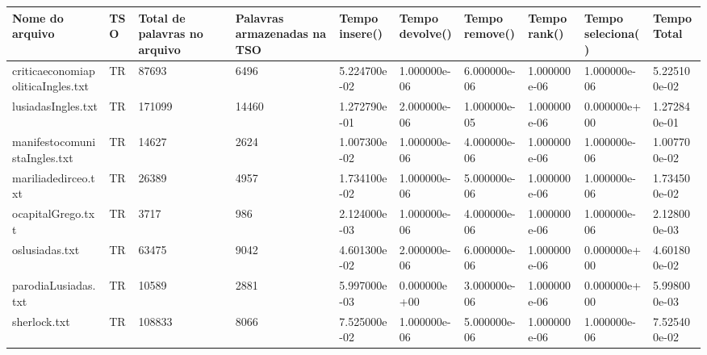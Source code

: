 \begin{tabular}{|l|l|l|l|l|l|l|l|l|l|}
\hline
Nome do arquivo&TSO&Total de palavras no arquivo&Palavras armazenadas na TSO&Tempo insere()&Tempo devolve()&Tempo remove()&Tempo rank()&Tempo seleciona()&Tempo Total\\
\hline
criticaeconomiapoliticaIngles.txt&TR&87693&6496&5.224700e-02&1.000000e-06&6.000000e-06&1.000000e-06&1.000000e-06&5.225100e-02\\
\hline
lusiadasIngles.txt&TR&171099&14460&1.272790e-01&2.000000e-06&1.000000e-05&1.000000e-06&0.000000e+00&1.272840e-01\\
\hline
manifestocomunistaIngles.txt&TR&14627&2624&1.007300e-02&1.000000e-06&4.000000e-06&1.000000e-06&1.000000e-06&1.007700e-02\\
\hline
mariliadedirceo.txt&TR&26389&4957&1.734100e-02&1.000000e-06&5.000000e-06&1.000000e-06&1.000000e-06&1.734500e-02\\
\hline
ocapitalGrego.txt&TR&3717&986&2.124000e-03&1.000000e-06&4.000000e-06&1.000000e-06&1.000000e-06&2.128000e-03\\
\hline
oslusiadas.txt&TR&63475&9042&4.601300e-02&2.000000e-06&6.000000e-06&1.000000e-06&0.000000e+00&4.601800e-02\\
\hline
parodiaLusiadas.txt&TR&10589&2881&5.997000e-03&0.000000e+00&3.000000e-06&1.000000e-06&0.000000e+00&5.998000e-03\\
\hline
sherlock.txt&TR&108833&8066&7.525000e-02&1.000000e-06&5.000000e-06&1.000000e-06&1.000000e-06&7.525400e-02\\
\hline
\end{tabular}
